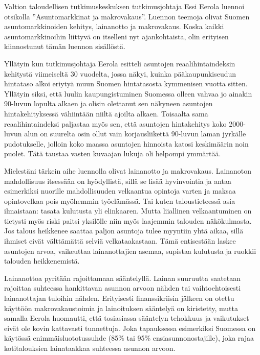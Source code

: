 \documentclass[12pt]{article}
\begin{document}
Valtion taloudellisen tutkimuskeskuksen tutkimusjohtaja Essi Eerola luennoi otsikolla ''Asuntomarkkinat ja makrovakaus''. Luennon teemoja olivat Suomen asuntomarkkinoiden kehitys, lainanotto ja makrovakaus. Koska kaikki asuntomarkkinoihin liittyvä on itselleni nyt ajankohtaista, olin erityisen kiinnostunut tämän luennon sisällöstä.

Yllätyin kun tutkimusjohtaja Eerola esitteli asuntojen reaalihintaindeksin kehitystä viimeiseltä 30 vuodelta, jossa näkyi, kuinka pääkaupunkiseudun hintataso alkoi eriytyä muun Suomen hintatasosta kymmenisen vuotta sitten. Yllätyin siksi, että luulin kaupungistuminen Suomessa olleen vahvaa jo ainakin 90-luvun lopulta alkaen ja olisin olettanut sen näkyneen asuntojen hintakehityksessä vähiintään niiltä ajoilta alkaen. Toisaalta sama reaalihintaindeksi paljastaa myös sen, että asuntojen hintakehitys koko 2000-luvun alun on suurelta osin ollut vain korjausliikettä 90-luvun laman jyrkälle pudotukselle, jolloin koko maassa asuntojen hinnoista katosi keskimäärin noin puolet. Tätä taustaa vasten kuvaajan lukuja oli helpompi ymmärtää.

Mielestäni tärkein aihe luennolla olivat lainanotto ja makrovakaus. Lainanoton mahdollisuus itsessään on hyödyllistä, sillä se lisää hyvinvointia ja antaa esimerkiksi nuorille mahdollisuuden velkaantua opintoja varten ja maksaa opintovelkaa pois myöhemmin työelämässä. Tai kuten taloustieteessä asia ilmaistaan: tasata kulutusta yli elinkaaren. Mutta liiallinen velkaantuminen on tietysti myös riski paitsi yksilölle niin myös laajemmin talouden näkökulmasta. Jos talous heikkenee saattaa paljon asuntoja tulee myyntiin yhtä aikaa, sillä ihmiset eivät välttämättä selviä velkataakastaan. Tämä entisestään laskee asuntojen arvoa, vaikeuttaa lainanottajien asemaa, supistaa kulutusta ja ruokkii talouden heikkenemistä.

Lainanottoa pyritään rajoittamaan sääntelyllä. Lainan suuruutta saatetaan rajoittaa suhteessa hankittavan asunnon arvoon nähden tai vaihtoehtoisesti lainanottajan tuloihin nähden. Erityisesti finanssikriisin jälkeen on otettu käyttöön makrovakaustoimia ja lainoituksen sääntelyä on kiristetty, mutta samalla Eerola huomautti, että tosiasiassa sääntelyn tehokkuus ja vaikutukset eivät ole kovin kattavasti tunnettuja. Joka tapauksessa esimerkiksi Suomessa on käytössä enimmäisluototussuhde (85\% tai 95\% ensiasunnonostajille), joka rajaa kotitalouksien lainataakkaa suhteessa asunnon arvoon.

\end{document}
